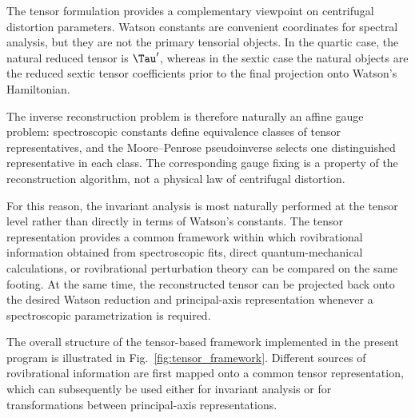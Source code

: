 The tensor formulation provides a complementary viewpoint on centrifugal
distortion parameters.  Watson constants are convenient coordinates for spectral
analysis, but they are not the primary tensorial objects.  In the quartic case,
the natural reduced tensor is $\Tau'$, whereas in the sextic case the natural
objects are the reduced sextic tensor coefficients prior to the final projection
onto Watson's Hamiltonian.

The inverse reconstruction problem is therefore naturally an affine gauge
problem: spectroscopic constants define equivalence classes of tensor
representatives, and the Moore--Penrose pseudoinverse selects one distinguished
representative in each class.  The corresponding gauge fixing is a property of
the reconstruction algorithm, not a physical law of centrifugal distortion.

For this reason, the invariant analysis is most naturally performed at the
tensor level rather than directly in terms of Watson's constants.  The tensor
representation provides a common framework within which rovibrational
information obtained from spectroscopic fits, direct quantum-mechanical
calculations, or rovibrational perturbation theory can be compared on the same
footing.  At the same time, the reconstructed tensor can be projected back onto
the desired Watson reduction and principal-axis representation whenever a
spectroscopic parametrization is required.

The overall structure of the tensor-based framework implemented in the present
program is illustrated in Fig.~\ref{fig:tensor_framework}.  Different sources of
rovibrational information are first mapped onto a common tensor representation,
which can subsequently be used either for invariant analysis or for
transformations between principal-axis representations.

